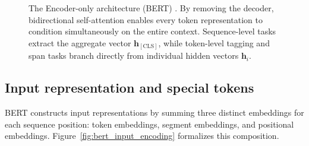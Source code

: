 \documentclass[../../main.tex]{subfiles}
\begin{document}
\begin{figure}[t]
\caption{The Encoder-only architecture (BERT) \cite{devlin2019}. By removing the decoder, bidirectional self-attention enables every token representation to condition simultaneously on the entire context. Sequence-level tasks extract the aggregate vector $\mathbf{h}_{[\text{CLS}]}$, while token-level tagging and span tasks branch directly from individual hidden vectors $\mathbf{h}_i$.}
\label{fig:encoder_only_bert}
\end{figure}


\subsection{Input representation and special tokens}
\label{subsec:bert_input_representation}

BERT constructs input representations by summing three distinct embeddings for each sequence position: token embeddings, segment embeddings, and positional embeddings. Figure~\ref{fig:bert_input_encoding} formalizes this composition.
\end{document}
